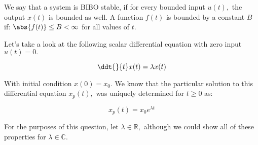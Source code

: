 

We say that a system is BIBO stable, if for every bounded input $u(t),$ the output $x(t)$ is bounded as well. \vskip 1pt
A function $f(t)$ is bounded by a constant $B$ if: $\abs{f(t)} \leq B < \infty$ for all values of $t.$

Let's take a look at the following scalar differential equation with zero input $u(t) = 0.$

\begin{equation} \label{eq:h}
\ddt{}{t} x(t) = \lambda x(t) 
\end{equation}

With initial condition $x(0) = x_{0}.$ 
We know that the particular solution to this differential equation $x_{p}(t),$ was uniquely determined for $t \geq 0$ as:

\begin{equation} \label{eq:h}
x_{p}(t) = x_{0} e^{\lambda t}
\end{equation}

For the purposes of this question, let $\lambda \in \mathbb{R},$ although we could show all of these properties for $\lambda \in \mathbb{C}.$

